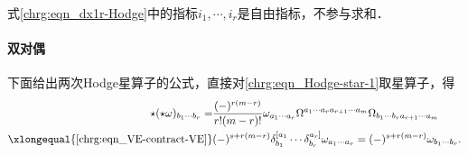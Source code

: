 式\eqref{chrg:eqn_dx1r-Hodge}中的指标$i_1,\cdots,i_r$是自由指标，不参与求和．



\paragraph{双对偶}
下面给出两次Hodge星算子的公式，直接对\eqref{chrg:eqn_Hodge-star-1}取星算子，得
\begin{align}
    \star (\star \omega)_{b_1 \cdots b_r} 
    =&  \frac{(-)^{r(m-r)}}{r! (m-r)!} \omega_{a_1 \cdots a_r}
     \Omega^{a_1 \cdots a_r a_{r+1} \cdots a_m}
     \Omega_{{b_1 \cdots b_r} a_{r+1} \cdots a_m}\notag \\
     \xlongequal{\ref{chrg:eqn_VE-contract-VE}} &
     (-)^{s+r(m-r)} \delta^{\lbrack a_1}_{b_1} \cdots \delta^{a_r \rbrack}_{b_r}
     \omega_{a_1 \cdots a_r}
     =(-)^{s+r(m-r)} \omega_{b_1 \cdots b_r} . \label{chrg:eqn_double-star-Hodge}
\end{align}


